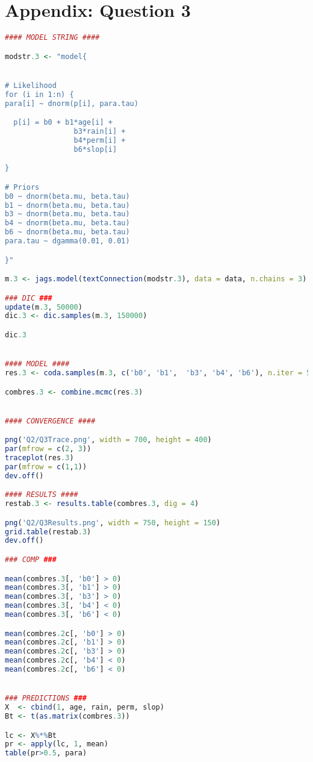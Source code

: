 \documentclass[11pt]{article}
\begin{document}
\section{Appendix: Question 3} \label{appA3}
\begin{lstlisting}[language=R]
#### MODEL STRING ####

modstr.3 <- "model{


# Likelihood
for (i in 1:n) {
para[i] ~ dnorm(p[i], para.tau)

  p[i] = b0 + b1*age[i] +  
                b3*rain[i] + 
                b4*perm[i] + 
                b6*slop[i]

}     

# Priors
b0 ~ dnorm(beta.mu, beta.tau)
b1 ~ dnorm(beta.mu, beta.tau)
b3 ~ dnorm(beta.mu, beta.tau)
b4 ~ dnorm(beta.mu, beta.tau)
b6 ~ dnorm(beta.mu, beta.tau)
para.tau ~ dgamma(0.01, 0.01)

}"

m.3 <- jags.model(textConnection(modstr.3), data = data, n.chains = 3)

### DIC ###
update(m.3, 50000)
dic.3 <- dic.samples(m.3, 150000)

dic.3


#### MODEL ####
res.3 <- coda.samples(m.3, c('b0', 'b1',  'b3', 'b4', 'b6'), n.iter = 50000, thin = 10)

combres.3 <- combine.mcmc(res.3)


#### CONVERGENCE ####

png('Q2/Q3Trace.png', width = 700, height = 400)
par(mfrow = c(2, 3))
traceplot(res.3)
par(mfrow = c(1,1))
dev.off()

#### RESULTS ####
restab.3 <- results.table(combres.3, dig = 4)

png('Q2/Q3Results.png', width = 750, height = 150)
grid.table(restab.3)
dev.off()

### COMP ###

mean(combres.3[, 'b0'] > 0)
mean(combres.3[, 'b1'] > 0)
mean(combres.3[, 'b3'] > 0)
mean(combres.3[, 'b4'] < 0)
mean(combres.3[, 'b6'] < 0)

mean(combres.2c[, 'b0'] > 0)
mean(combres.2c[, 'b1'] > 0)
mean(combres.2c[, 'b3'] > 0)
mean(combres.2c[, 'b4'] < 0)
mean(combres.2c[, 'b6'] < 0)


### PREDICTIONS ###
X  <- cbind(1, age, rain, perm, slop)
Bt <- t(as.matrix(combres.3))

lc <- X%*%Bt
pr <- apply(lc, 1, mean)
table(pr>0.5, para)
\end{lstlisting}
\end{document}
